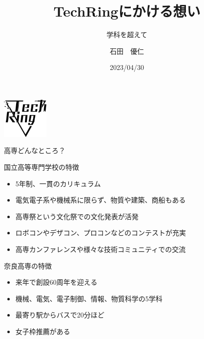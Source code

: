 \documentclass[dvipdfmx]{beamer}
\title{TechRingにかける想い}
\subtitle{学科を超えて}
\author[Jin]{石田　優仁}
\institute[TechRing]{奈良高専TechRing}
\date[2023/04/30]{2023/04/30}
\begin{document}
\begin{frame}
  \begin{flushright}
      \includegraphics[width=2.3cm]{pic/Logo.png}
  \end{flushright}
  \titlepage
\end{frame}

\begin{frame}{高専どんなところ？}

  \begin{block}{国立高等専門学校の特徴}
    \begin{itemize}
      \setlength{\itemsep}{1mm}
      \item 5年制、一貫のカリキュラム
      \item 電気電子系や機械系に限らず、物質や建築、商船もある
      \item 高専祭という文化祭での文化発表が活発
      \item ロボコンやデザコン、プロコンなどのコンテストが充実
      \item 高専カンファレンスや様々な技術コミュニティでの交流
    \end{itemize}
  \end{block}

  \begin{alertblock}{奈良高専の特徴}
      \begin{itemize}
        \setlength{\itemsep}{1mm}
        \item 来年で創設60周年を迎える
        \item 機械、電気、電子制御、情報、物質科学の5学科
        \item 最寄り駅からバスで20分ほど
        \item 女子枠推薦がある
      \end{itemize}
  \end{alertblock}

\end{frame}
\end{document}
